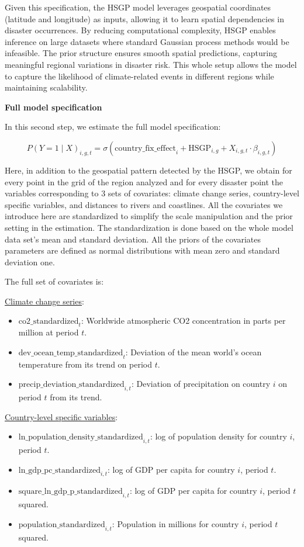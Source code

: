 Given this specification, the HSGP model leverages geospatial coordinates (latitude and longitude) as inputs, allowing it to learn spatial dependencies in disaster occurrences. By reducing computational complexity, HSGP enables inference on large datasets where standard Gaussian process methods would be infeasible. The prior structure ensures smooth spatial predictions, capturing meaningful regional variations in disaster risk. This whole setup allows the model to capture the likelihood of climate-related events in different regions while maintaining scalability.

\textbf{Full model specification}

In this second step, we estimate the full model specification:

\begin{equation}
P(Y=1 \mid X)_{i,g,t} = \sigma\left( \text{country\_fix\_effect}_i + \text{HSGP}_{i,g} + X_{i,g,t} \cdot \beta_{i,g,t} \right)
\end{equation}

Here, in addition to the geospatial pattern detected by the HSGP, we obtain for every point in the grid of the region analyzed and for every disaster point the variables corresponding to 3 sets of covariates: climate change series, country-level specific variables, and distances to rivers and coastlines. All the covariates we introduce here are standardized to simplify the scale manipulation and the prior setting in the estimation. The standardization is done based on the whole model data set's mean and standard deviation. All the priors of the covariates parameters are defined as normal distributions with mean zero and standard deviation one.

The full set of covariates is:

\underline{Climate change series}:
\begin{itemize}
    \item $\text{co2\_standardized}_{t}$: Worldwide atmospheric CO2 concentration in parts per million at period $t$.
    \item $\text{dev\_ocean\_temp\_standardized}_t$: Deviation of the mean world's ocean temperature from its trend on period $t$.
    \item $\text{precip\_deviation\_standardized}_{i,t}$: Deviation of precipitation on country $i$ on period $t$ from its trend.
\end{itemize}

\underline{Country-level specific variables}:
\begin{itemize}
    \item $\text{ln\_population\_density\_standardized}_{i,t}$: log of population density for country $i$, period $t$.
    \item $\text{ln\_gdp\_pc\_standardized}_{i,t}$: log of GDP per capita for country $i$, period $t$.
    \item $\text{square\_ln\_gdp\_p\_standardized}_{i,t}$: log of GDP per capita for country $i$, period $t$ squared.
    \item $\text{population\_standardized}_{i,t}$: Population in millions for country $i$, period $t$ squared.
\end{itemize}


